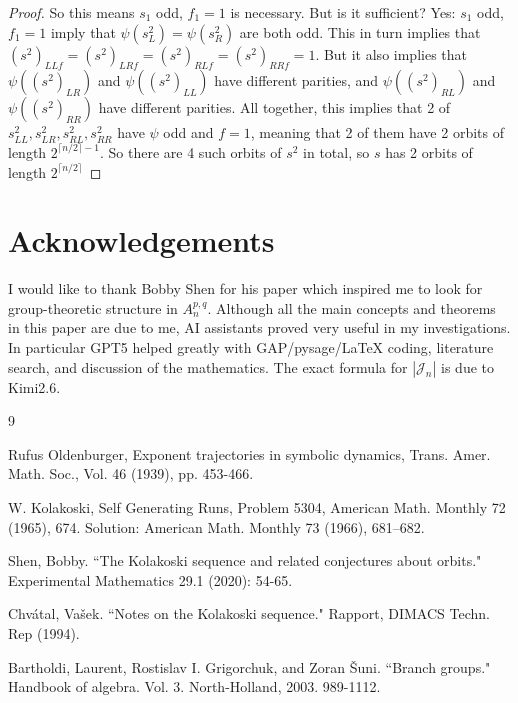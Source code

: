 \documentclass[11pt]{article}
\theoremstyle{plain}
\theoremstyle{definition}
\begin{document}
\begin{proof}
So this means $s_1$ odd, $f_1=1$ is necessary. But is it sufficient? Yes: $s_1$ odd, $f_1=1$ imply that $\psi (s^2_L) = \psi(s^2_R)$ are both odd. This in turn implies that $(s^2)_{LLf} = (s^2)_{LRf} =(s^2)_{RLf}=(s^2)_{RRf}=1$. But it also implies that $\psi((s^2)_{LR})$ and  $\psi((s^2)_{LL})$ have different parities, and $\psi((s^2)_{RL})$ and $\psi((s^2)_{RR})$ have different parities. All together, this implies that 2 of $s^2_{LL}, s^2_{LR}, s^2_{RL}, s^2_{RR}$ have $\psi$ odd and $f=1$, meaning that 2 of them have 2 orbits of length $2^{\lceil n/2 \rceil-1}$. So there are 4 such orbits of $s^2$ in total, so $s$ has 2 orbits of length $2^{\lceil n/2 \rceil}$

    
\end{proof}


\section{Acknowledgements}
I would like to thank Bobby Shen for his paper \cite{shen} which inspired me to look for group-theoretic structure in $A_n^{p,q}$. Although all the main concepts and theorems in this paper are due to me, AI assistants proved very useful in my investigations. In particular GPT5 helped greatly with GAP/pysage/LaTeX coding, literature search, and discussion of the mathematics. The exact formula for $|\mathcal{J}_n|$ is due to Kimi2.6.
\begin{thebibliography}{9}

 Rufus Oldenburger, Exponent trajectories in symbolic dynamics, Trans. Amer. Math. Soc., Vol. 46 (1939), pp. 453-466.

 W. Kolakoski, Self Generating Runs, Problem 5304, American Math. Monthly 72 (1965), 674. Solution: American Math. Monthly 73 (1966), 681--682.

Shen, Bobby. ``The Kolakoski sequence and related conjectures about orbits." Experimental Mathematics 29.1 (2020): 54-65.

Chvátal, Vašek. ``Notes on the Kolakoski sequence." Rapport, DIMACS Techn. Rep (1994).

Bartholdi, Laurent, Rostislav I. Grigorchuk, and Zoran Šuni. ``Branch groups." Handbook of algebra. Vol. 3. North-Holland, 2003. 989-1112.

\end{thebibliography}
\end{document}
